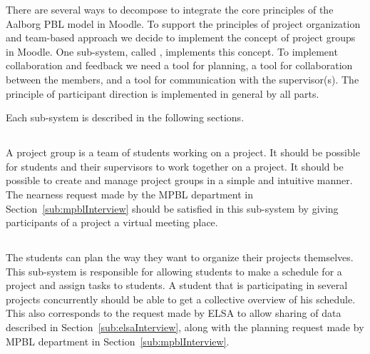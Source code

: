 There are several ways to decompose \system{} to integrate the core principles of the Aalborg PBL model in Moodle. 
To support the principles of project organization and team-based approach we decide to implement the concept of project groups in Moodle. 
One sub-system, called \administrationgroup{}, implements this concept.
To implement collaboration and feedback we need a tool for planning, a tool for collaboration between the members, and a tool for communication with the supervisor(s). 
The principle of participant direction is implemented in general by all parts. 

Each sub-system is described in the following sections. %


\subsection{\administrationgroup{}} %
\label{sec:admgroupdecom}
A project group is a team of students working on a project.
It should be possible for students and their supervisors to work together on a project.
It should be possible to create and manage project groups in a simple and intuitive manner.
The nearness request made by the MPBL department in Section~\ref{sub:mpblInterview} should be satisfied in this sub-system by giving participants of a project a virtual meeting place.

\subsection{\timelinegroup{}} %
The students can plan the way they want to organize their projects themselves.
This sub-system is responsible for allowing students to make a schedule for a project and assign tasks to students.
A student that is participating in several projects concurrently should be able to get a collective overview of his schedule. %
This also corresponds to the request made by ELSA to allow sharing of data described in Section~\ref{sub:elsaInterview}, along with the planning request made by MPBL department in Section~\ref{sub:mpblInterview}.

